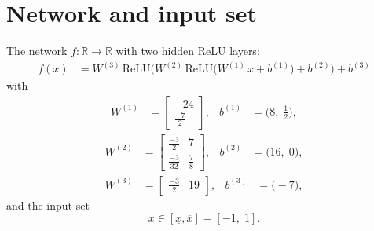 \documentclass[11pt]{article}
\begin{document}
\section{Network and input set}
The network $f:\mathbb{R} \to \mathbb{R}$ with two hidden ReLU layers:
\begin{align*}
f(x) &= W^{(3)}\,\mathrm{ReLU}\bigl(W^{(2)}\,\mathrm{ReLU}\bigl(W^{(1)}\,x + b^{(1)}\bigr) + b^{(2)}\bigr) + b^{(3)}
\end{align*}
with
\begin{align*}
W^{(1)} &= \begin{bmatrix}
-24 \\
\frac{-7}{2}
\end{bmatrix}, & b^{(1)} &= \bigl(8,\; \frac{1}{2}\bigr),
\end{align*}
\begin{align*}
W^{(2)} &= \begin{bmatrix}
\frac{-3}{2} & 7 \\
\frac{-3}{32} & \frac{7}{8}
\end{bmatrix}, & b^{(2)} &= \bigl(16,\; 0\bigr),
\end{align*}
\begin{align*}
W^{(3)} &= \begin{bmatrix}
\frac{-3}{2} & 19
\end{bmatrix}, & b^{(3)} &= \bigl(-7\bigr),
\end{align*}
and the input set
\begin{equation*}
 x \in [\underline{x}, \overline{x}] = [-1,\; 1].
\end{equation*}
\end{document}
